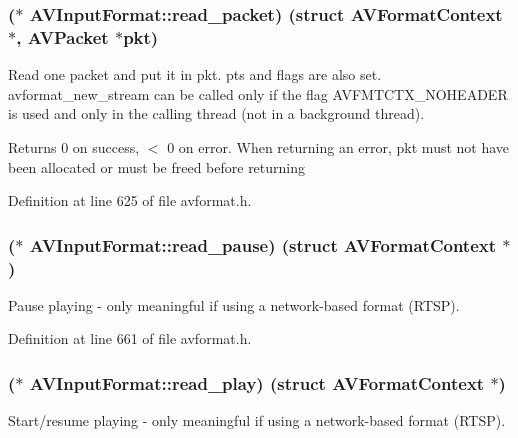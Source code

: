 \subsubsection[{\texorpdfstring{read\+\_\+packet}{read_packet}}]{($\ast$ A\+V\+Input\+Format\+::read\+\_\+packet) (struct {\bf A\+V\+Format\+Context} $\ast$, {\bf A\+V\+Packet} $\ast$pkt)}\hypertarget{struct_a_v_input_format_aef741db739cb5af755f01f2a818b61a7}{}\label{struct_a_v_input_format_aef741db739cb5af755f01f2a818b61a7}
Read one packet and put it in \textquotesingle{}pkt\textquotesingle{}. pts and flags are also set. \textquotesingle{}avformat\+\_\+new\+\_\+stream\textquotesingle{} can be called only if the flag A\+V\+F\+M\+T\+C\+T\+X\+\_\+\+N\+O\+H\+E\+A\+D\+ER is used and only in the calling thread (not in a background thread). \begin{DoxyReturn}{Returns}
0 on success, $<$ 0 on error. When returning an error, pkt must not have been allocated or must be freed before returning 
\end{DoxyReturn}


Definition at line 625 of file avformat.\+h.

\subsubsection[{\texorpdfstring{read\+\_\+pause}{read_pause}}]{($\ast$ A\+V\+Input\+Format\+::read\+\_\+pause) (struct {\bf A\+V\+Format\+Context} $\ast$)}\hypertarget{struct_a_v_input_format_a4e4da186feab0a2900404e77aa3631f4}{}\label{struct_a_v_input_format_a4e4da186feab0a2900404e77aa3631f4}
Pause playing -\/ only meaningful if using a network-\/based format (R\+T\+SP). 

Definition at line 661 of file avformat.\+h.

\subsubsection[{\texorpdfstring{read\+\_\+play}{read_play}}]{($\ast$ A\+V\+Input\+Format\+::read\+\_\+play) (struct {\bf A\+V\+Format\+Context} $\ast$)}\hypertarget{struct_a_v_input_format_a4658ac53d7c6eaea445409010cd3b474}{}\label{struct_a_v_input_format_a4658ac53d7c6eaea445409010cd3b474}
Start/resume playing -\/ only meaningful if using a network-\/based format (R\+T\+SP). 

